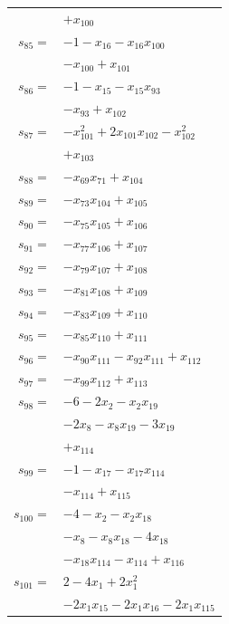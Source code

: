 \begin{longtable}{@{}r@{\;}l@{}}
 & \(\displaystyle +x_{100}\) \\[3pt]
\(s_{85}=\) & \(\displaystyle -1 -x_{16} -x_{16}x_{100}\) \\
 & \(\displaystyle -x_{100} +x_{101}\) \\[3pt]
\(s_{86}=\) & \(\displaystyle -1 -x_{15} -x_{15}x_{93}\) \\
 & \(\displaystyle -x_{93} +x_{102}\) \\[3pt]
\(s_{87}=\) & \(\displaystyle -x_{101}^{2} +2x_{101}x_{102} -x_{102}^{2}\) \\
 & \(\displaystyle +x_{103}\) \\[3pt]
\(s_{88}=\) & \(\displaystyle -x_{69}x_{71} +x_{104}\) \\[3pt]
\(s_{89}=\) & \(\displaystyle -x_{73}x_{104} +x_{105}\) \\[3pt]
\(s_{90}=\) & \(\displaystyle -x_{75}x_{105} +x_{106}\) \\[3pt]
\(s_{91}=\) & \(\displaystyle -x_{77}x_{106} +x_{107}\) \\[3pt]
\(s_{92}=\) & \(\displaystyle -x_{79}x_{107} +x_{108}\) \\[3pt]
\(s_{93}=\) & \(\displaystyle -x_{81}x_{108} +x_{109}\) \\[3pt]
\(s_{94}=\) & \(\displaystyle -x_{83}x_{109} +x_{110}\) \\[3pt]
\(s_{95}=\) & \(\displaystyle -x_{85}x_{110} +x_{111}\) \\[3pt]
\(s_{96}=\) & \(\displaystyle -x_{90}x_{111} -x_{92}x_{111} +x_{112}\) \\[3pt]
\(s_{97}=\) & \(\displaystyle -x_{99}x_{112} +x_{113}\) \\[3pt]
\(s_{98}=\) & \(\displaystyle -6 -2x_{2} -x_{2}x_{19}\) \\
 & \(\displaystyle -2x_{8} -x_{8}x_{19} -3x_{19}\) \\
 & \(\displaystyle +x_{114}\) \\[3pt]
\(s_{99}=\) & \(\displaystyle -1 -x_{17} -x_{17}x_{114}\) \\
 & \(\displaystyle -x_{114} +x_{115}\) \\[3pt]
\(s_{100}=\) & \(\displaystyle -4 -x_{2} -x_{2}x_{18}\) \\
 & \(\displaystyle -x_{8} -x_{8}x_{18} -4x_{18}\) \\
 & \(\displaystyle -x_{18}x_{114} -x_{114} +x_{116}\) \\[3pt]
\(s_{101}=\) & \(\displaystyle 2 -4x_{1} +2x_{1}^{2}\) \\
 & \(\displaystyle -2x_{1}x_{15} -2x_{1}x_{16} -2x_{1}x_{115}\) \\

\end{longtable}
